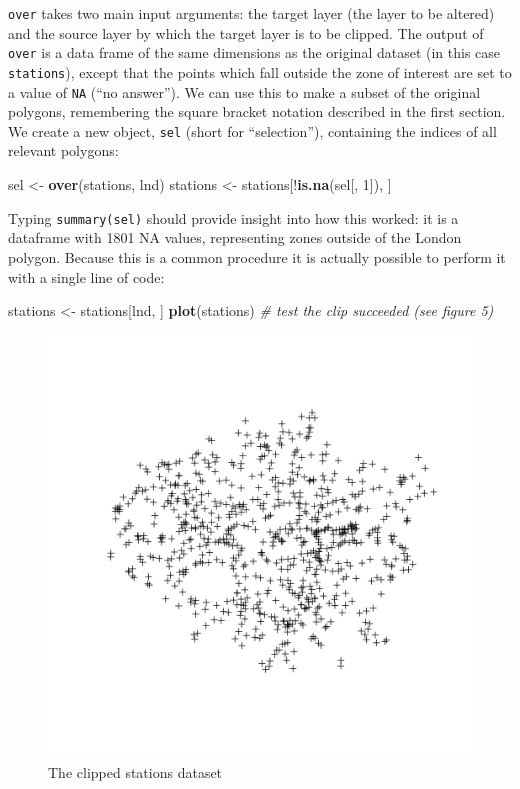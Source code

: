 \documentclass[]{article}
\newenvironment{Shaded}{}{}
\newcommand{\KeywordTok}[1]{\textcolor[rgb]{0.00,0.44,0.13}{\textbf{{#1}}}}
\newcommand{\DecValTok}[1]{\textcolor[rgb]{0.25,0.63,0.44}{{#1}}}
\newcommand{\StringTok}[1]{\textcolor[rgb]{0.25,0.44,0.63}{{#1}}}
\newcommand{\CommentTok}[1]{\textcolor[rgb]{0.38,0.63,0.69}{\textit{{#1}}}}
\newcommand{\NormalTok}[1]{{#1}}
\begin{document}
\texttt{over} takes two main input arguments: the target layer (the
layer to be altered) and the source layer by which the target layer is
to be clipped. The output of \texttt{over} is a data frame of the same
dimensions as the original dataset (in this case \texttt{stations}),
except that the points which fall outside the zone of interest are set
to a value of \texttt{NA} (``no answer''). We can use this to make a
subset of the original polygons, remembering the square bracket notation
described in the first section. We create a new object, \texttt{sel}
(short for ``selection''), containing the indices of all relevant
polygons:

\begin{Shaded}
\begin{Highlighting}[]
\NormalTok{sel <-}\StringTok{ }\KeywordTok{over}\NormalTok{(stations, lnd)}
\NormalTok{stations <-}\StringTok{ }\NormalTok{stations[!}\KeywordTok{is.na}\NormalTok{(sel[, }\DecValTok{1}\NormalTok{]), ]}
\end{Highlighting}
\end{Shaded}

Typing \texttt{summary(sel)} should provide insight into how this
worked: it is a dataframe with 1801 NA values, representing zones
outside of the London polygon. Because this is a common procedure it is
actually possible to perform it with a single line of code:

\begin{Shaded}
\begin{Highlighting}[]
\NormalTok{stations <-}\StringTok{ }\NormalTok{stations[lnd, ]}
\KeywordTok{plot}\NormalTok{(stations)  }\CommentTok{# test the clip succeeded (see figure 5)}
\end{Highlighting}
\end{Shaded}

\begin{figure}[htbp]
\centering
\includegraphics{figure/The_clipped_stations_dataset.png}
\caption{The clipped stations dataset}
\end{figure}
\end{document}
